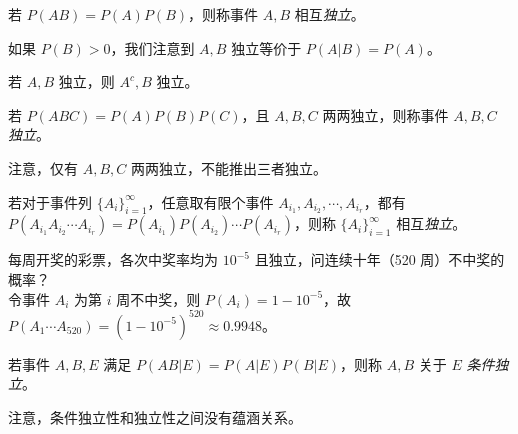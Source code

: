 \documentclass[../main.tex]{subfiles}
\begin{document}
\begin{definition}\label{def:1.7.1}
    若 $P(AB)=P(A)P(B)$，则称事件 $A,B$ 相互\emph{独立}。
\end{definition}

如果 $P(B)>0$，我们注意到 $A,B$ 独立等价于 $P(A|B)=P(A)$。

\begin{proposition}
    若 $A,B$ 独立，则 $A^c,B$ 独立。
\end{proposition}

\begin{definition}\label{def:1.7.2}
    若 $P(ABC)=P(A)P(B)P(C)$，且 $A,B,C$ 两两独立，则称事件 $A,B,C$ \emph{独立}。
\end{definition}

注意，仅有 $A,B,C$ 两两独立，不能推出三者独立。

\begin{definition}\label{def:1.7.3}
    若对于事件列 $\{A_i\}_{i=1}^\infty$，任意取有限个事件 $A_{i_1},A_{i_2},\cdots,A_{i_r}$，都有 $P(A_{i_1}A_{i_2}\cdots A_{i_r})=P(A_{i_1})P(A_{i_2})\cdots P(A_{i_r})$，则称 $\{A_i\}_{i=1}^\infty$ 相互\emph{独立}。
\end{definition}

\begin{example}
    每周开奖的彩票，各次中奖率均为 $10^{-5}$ 且独立，问连续十年（520 周）不中奖的概率？\\
    令事件 $A_i$ 为第 $i$ 周不中奖，则 $P(A_i)=1-10^{-5}$，故 $P(A_1\cdots A_{520})=(1-10^{-5})^{520}\approx 0.9948$。
\end{example}

\begin{definition}\label{def:1.7.4}
    若事件 $A,B,E$ 满足 $P(AB|E)=P(A|E)P(B|E)$，则称 $A,B$ 关于 $E$ \emph{条件独立}。
\end{definition}

注意，条件独立性和独立性之间没有蕴涵关系。
\end{document}
